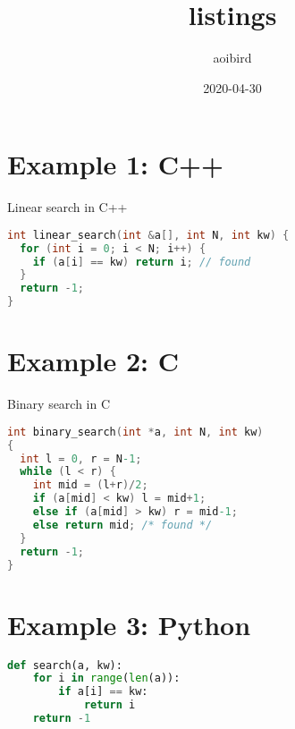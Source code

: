\documentclass{article}
\title{listings}
\author{aoibird}
\date{2020-04-30}
\begin{document}
\maketitle

\lstlistoflistings

\section{Example 1: C++}
Linear search in C++

\begin{lstlisting}[language=C++, caption=linear search]
int linear_search(int &a[], int N, int kw) {
  for (int i = 0; i < N; i++) {
    if (a[i] == kw) return i; // found
  }
  return -1;
}
\end{lstlisting}

\section{Example 2: C}
Binary search in C

\begin{lstlisting}[language=C, caption=binary search]
int binary_search(int *a, int N, int kw)
{
  int l = 0, r = N-1;
  while (l < r) {
    int mid = (l+r)/2;
    if (a[mid] < kw) l = mid+1;
    else if (a[mid] > kw) r = mid-1;
    else return mid; /* found */
  }
  return -1;
}
\end{lstlisting}

\section{Example 3: Python}
\begin{lstlisting}[language=Python, caption=search]
def search(a, kw):
    for i in range(len(a)):
        if a[i] == kw:
            return i
    return -1
\end{lstlisting}
\end{document}
